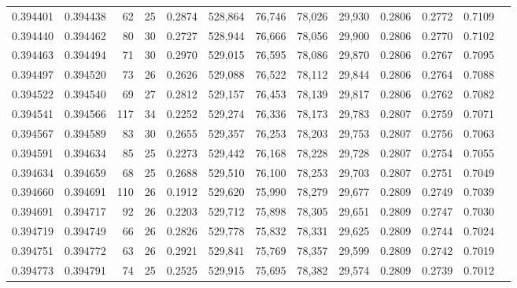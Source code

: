 \begin{tabular}{rrrrrrrrrrrrr}
0.394401 & 0.394438 &    62 &  25 &                                     0.2874 & 528,864 &  76,746 &  78,026 &  29,930 & 0.2806 & 0.2772 & 0.7109 \\
0.394440 & 0.394462 &    80 &  30 &                                     0.2727 & 528,944 &  76,666 &  78,056 &  29,900 & 0.2806 & 0.2770 & 0.7102 \\
0.394463 & 0.394494 &    71 &  30 &                                     0.2970 & 529,015 &  76,595 &  78,086 &  29,870 & 0.2806 & 0.2767 & 0.7095 \\
0.394497 & 0.394520 &    73 &  26 &                                     0.2626 & 529,088 &  76,522 &  78,112 &  29,844 & 0.2806 & 0.2764 & 0.7088 \\
0.394522 & 0.394540 &    69 &  27 &                                     0.2812 & 529,157 &  76,453 &  78,139 &  29,817 & 0.2806 & 0.2762 & 0.7082 \\
0.394541 & 0.394566 &   117 &  34 &                                     0.2252 & 529,274 &  76,336 &  78,173 &  29,783 & 0.2807 & 0.2759 & 0.7071 \\
0.394567 & 0.394589 &    83 &  30 &                                     0.2655 & 529,357 &  76,253 &  78,203 &  29,753 & 0.2807 & 0.2756 & 0.7063 \\
0.394591 & 0.394634 &    85 &  25 &                                     0.2273 & 529,442 &  76,168 &  78,228 &  29,728 & 0.2807 & 0.2754 & 0.7055 \\
0.394634 & 0.394659 &    68 &  25 &                                     0.2688 & 529,510 &  76,100 &  78,253 &  29,703 & 0.2807 & 0.2751 & 0.7049 \\
0.394660 & 0.394691 &   110 &  26 &                                     0.1912 & 529,620 &  75,990 &  78,279 &  29,677 & 0.2809 & 0.2749 & 0.7039 \\
0.394691 & 0.394717 &    92 &  26 &                                     0.2203 & 529,712 &  75,898 &  78,305 &  29,651 & 0.2809 & 0.2747 & 0.7030 \\
0.394719 & 0.394749 &    66 &  26 &                                     0.2826 & 529,778 &  75,832 &  78,331 &  29,625 & 0.2809 & 0.2744 & 0.7024 \\
0.394751 & 0.394772 &    63 &  26 &                                     0.2921 & 529,841 &  75,769 &  78,357 &  29,599 & 0.2809 & 0.2742 & 0.7019 \\
0.394773 & 0.394791 &    74 &  25 &                                     0.2525 & 529,915 &  75,695 &  78,382 &  29,574 & 0.2809 & 0.2739 & 0.7012 \\

\end{tabular}
